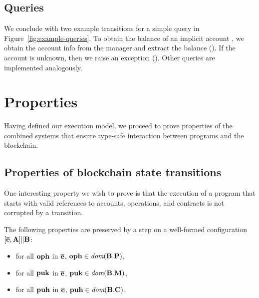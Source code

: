 \documentclass[runningheads]{llncs}
\begin{document}
\subsection{Queries}
\label{sec:queries}


We conclude with two example transitions for a simple query in
Figure~\ref{fig:example-queries}. To obtain the balance of an implicit
account \PUK, we obtain the account info from the manager and extract
the balance (). If the account is
unknown, then we raise an exception
(). Other queries are implemented analogously.

\section{Properties}
\label{sec:properties}
Having defined our execution model, we proceed to prove properties of the combined systems that ensure type-safe interaction between programs and the blockchain.
\subsection{Properties of blockchain state transitions}
One interesting property we wish to prove is that the execution of a program that starts with valid references to accounts, operations, and contracts is not corrupted by a transition.
\begin{proposition}
\label{propo:1}
  The following properties are preserved by a step on a well-formed
  configuration $ [\overline{\textbf{e}}, \textbf{A}] \| \textbf{B}$:
  \begin{itemize}
  \item for all $\textbf{oph}$ in $\overline{\textbf{e}}$, $\textbf{oph} \in \textit{dom} (\textbf{B}.\textbf{P})$,
  \item for all $\textbf{puk}$ in $\overline{\textbf{e}}$, $\textbf{puk} \in \textit{dom} (\textbf{B}.\textbf{M})$,
  \item for all $\textbf{puh}$ in $\overline{\textbf{e}}$, $\textbf{puh} \in \textit{dom} (\textbf{B}.\textbf{C})$.
  \end{itemize}
\end{proposition}
\end{document}

